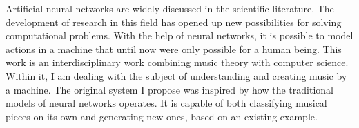 \noindent Artificial neural networks are widely discussed in the scientific literature. The development of research in this field has opened up new possibilities for solving computational problems. With the help of neural networks, it is possible to model actions in a machine that until now were only possible for a human being.
This work is an interdisciplinary work combining music theory with computer science. Within it, I am dealing with the subject of understanding and creating music by a machine. The original system I propose was inspired by how the traditional models of neural networks operates. It is capable of both classifying musical pieces on its own and generating new ones, based on an existing example.